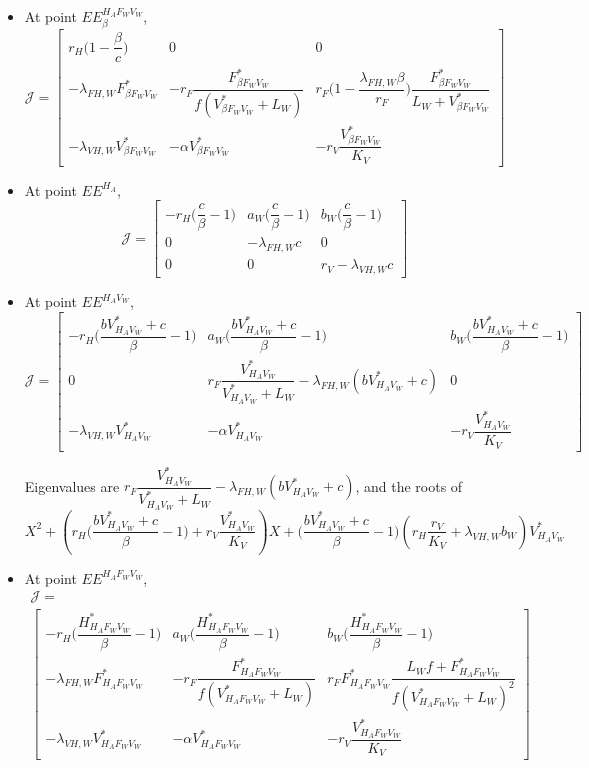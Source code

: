 \documentclass{article}
\newcommand{\lfw}{\lambda_{FH, W}}
\newcommand{\lvw}{\lambda_{VH, W}}
\begin{document}
\begin{itemize}
\item At point $EE^{H_AF_WV_W}_\beta$,
\begin{equation}
\mathcal{J} =
\begin{bmatrix}
r_H \Big(1 - \dfrac{\beta}{c} \Big) & 0 & 0 \\
-\lfw F^*_{\beta F_WV_W} & -r_F \dfrac{F^*_{\beta F_WV_W} }{f(V^*_{\beta F_WV_W}  + L_W)}  & r_F \Big(1 - \dfrac{\lfw \beta}{r_F} \Big) \dfrac{F^*_{\beta F_WV_W} }{L_W + V^*_{\beta F_WV_W} } \\
-\lvw V^*_{\beta F_WV_W}  & -\alpha V^*_{\beta F_WV_W}  & -r_V \dfrac{V^*_{\beta F_WV_W} }{K_V}
\end{bmatrix}
\end{equation}


\item At point $EE^{H_A}$,
\begin{equation}
\mathcal{J} =
\begin{bmatrix}
-r_H \Big(\dfrac{c}{\beta}-1\Big) & a_W \Big(\dfrac{c}{\beta}-1\Big) & b_W \Big(\dfrac{c}{\beta}-1\Big) \\
0 & -\lfw c  & 0 \\
0 & 0 & r_V - \lvw c
\end{bmatrix}
\end{equation}

\item At point $EE^{H_AV_W}$,
\begin{equation}
\mathcal{J} =
\begin{bmatrix}
-r_H \Big(\dfrac{bV^*_{H_AV_W} + c}{\beta}-1\Big) & a_W \Big(\dfrac{bV^*_{H_AV_W} + c}{\beta}-1\Big) & b_W \Big(\dfrac{bV^*_{H_AV_W} + c}{\beta}-1\Big) \\
0 & r_F \dfrac{V^*_{H_AV_W}}{V^*_{H_AV_W} + L_W}-\lfw (bV^*_{H_AV_W} + c)  & 0 \\
-\lvw V^*_{H_AV_W} & -\alpha V^*_{H_AV_W} & -r_V \dfrac{V^*_{H_AV_W}}{K_V} 
\end{bmatrix}
\end{equation}

Eigenvalues are $r_F\dfrac{V^*_{H_AV_W}}{V^*_{H_AV_W} + L_W}-\lfw (bV^*_{H_AV_W} + c)$, and the roots of
$$
X^2 + \left(r_H \Big(\dfrac{bV^*_{H_AV_W} + c}{\beta}-1\Big) + r_V \dfrac{V^*_{H_AV_W}}{K_V}  \right) X + \Big(\dfrac{bV^*_{H_AV_W} + c}{\beta}-1\Big) \left( r_H \dfrac{r_V}{K_V} +  \lvw b_W \right) V^*_{H_AV_W}
$$


\item At point $EE^{H_AF_WV_W}$, 
\begin{multline}
\mathcal{J} = \\
\begin{bmatrix}
-r_H \Big(\dfrac{H^*_{H_AF_WV_W}}{\beta}-1\Big) & a_W \Big(\dfrac{H^*_{H_AF_WV_W}}{\beta}-1\Big) & b_W \Big(\dfrac{H^*_{H_AF_WV_W}}{\beta}-1\Big) \\
-\lfw F^*_{H_AF_WV_W} & -r_F \dfrac{F^*_{H_AF_WV_W}}{f(V^*_{H_AF_WV_W} + L_W)} &
r_F F^*_{H_AF_WV_W} \dfrac{L_W f + F^*_{H_AF_WV_W}}{f(V^*_{H_AF_WV_W} + L_W)^2}\\
-\lvw V^*_{H_AF_WV_W} & -\alpha V^*_{H_AF_WV_W} & -r_V \dfrac{V^*_{H_AF_WV_W}}{K_V} 
\end{bmatrix}
\end{multline}
\end{itemize}
\end{document}
